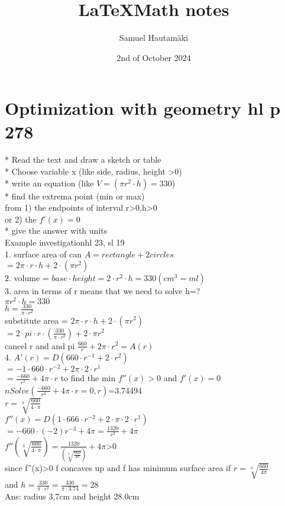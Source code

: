\documentclass{article}
\title{\LaTeX Math notes}
\author{Samuel Hautamäki}
\date{2nd of October 2024}
\begin{document}
  \maketitle
   
  \section{Optimization with geometry hl p 278}
  * Read the text and draw a sketch or table\\
  * Choose variable x (like side, radius, height >0)\\
  * write an equation (like $V=(\pi r^2\cdot h)=330$)\\
  * find the extrema point (min or max)\\
  from 1) the endpoints of interval r>0,h>0\\
  or 2) the $f'(x)=0$\\
  * give the answer with units\\
  Example investigationhl 23, sl 19 \\
  1. surface area of can $A=rectangle+2circles$\\
  $=2\pi\cdot r\cdot h+2\cdot(\pi r^2)$\\
  2. volume = $base\cdot height=2\cdot r^2\cdot h=330 (cm^3=ml)$\\
  3. area in terms of r means that we need to solve h=?\\
  $\pi r^2\cdot h=330$\\
  $h=\frac{330}{\pi\cdot r^2}$\\
  substitute area = $2\pi\cdot r\cdot h+ 2\cdot(\pi r^2)$\\
  $=2\cdot pi\cdot r\cdot (\frac{330}{\pi\cdot r^2})+2\cdot\pi r^2$\\
  cancel r and and pi $\frac{660}{r}+2\pi\cdot r^2=A(r)$\\
  4. $A'(r)= D(660\cdot r^{-1}+2\cdot r^2)$\\
  $=-1\cdot660\cdot r^{-2}+2\pi\cdot 2\cdot r^1$\\
  $=\frac{-660}{r^2}+4\pi\cdot r$ to find the min $f''(x)>0$ and $f'(x)=0$\\
  $nSolve(\frac{-660}{r^2}+4\pi\cdot r=0,r)$=3.74494\\
  $r=\sqrt[3]{\frac{660}{4\cdot\pi}}$\\
  $f''(x)=D(1\cdot 666\cdot r^{-2}+2\cdot\pi\cdot2\cdot r^1)$\\
  $=-660\cdot(-2)r^{-3}+4\pi=\frac{1320}{r^3}+4\pi$\\
  $f''(\sqrt[3]{\frac{660}{4\cdot\pi}})=\frac{1320}{(\sqrt[3]{\frac{660}{4\pi}})}+4\pi$>0\\
  since f''(x)>0 f concaves up and f has minimum surface area if $r=\sqrt[3]{\frac{660}{4\pi}}$\\
  and $h=\frac{330}{\pi\cdot r^2}=\frac{330}{\pi\cdot3.74}=28$\\
  Ans: radius 3,7cm and height 28.0cm\\
  
  

   
\end{document}
